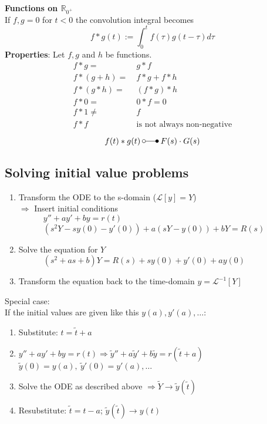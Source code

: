 \textbf{Functions on $\mathbb{R}_{0^+}$}\\
If $f,g=0$ for $t<0$ the convolution integral becomes
\begin{equation*}
    f*g(t):=\int_{0}^{t}f(\tau)g(t-\tau)d\tau
\end{equation*}
\textbf{Properties}: Let $f,g$ and $h$ be functions.
\begin{align*}
    f*g =     & \ g*f                               \\
    f*(g+h) = & \ f*g+f*h                           \\
    f*(g*h) = & \ (f*g)*h                           \\
    f*0 =     & \ 0*f=0                             \\
    f*1 \ne   & \ f                                 \\
    f*f \;    & \ \text{is not always non-negative}
\end{align*}
\begin{equation*}
    f(t)*g(t) \:\laplace\: F(s)\cdot G(s)
\end{equation*}

\subsection{Solving initial value problems}
\begin{enumerate}
    \item Transform the ODE to the s-domain ($\mathcal{L}[y]=Y$)\\
          $\Rightarrow$ Insert initial conditions\\
          $\quad\qquad y''+ay'+by=r(t)$\\
          $\quad\qquad(s^2Y-sy(0)-y'(0))+a(sY-y(0))+bY=R(s)$
    \item Solve the equation for $Y$ \\
          $\quad\qquad (s^2+as+b)Y=R(s)+sy(0)+y'(0)+ay(0)$
    \item Transform the equation back to the time-domain $y=\mathcal{L}^{-1}[Y]$
\end{enumerate}
Special case:\\
If the initial values are given like this $y(a),y'(a),\dots$:
\begin{enumerate}[label=\alph*]
    \item Substitute: $t=\tilde{t}+a$
    \item $y''+ay'+by=r(t) \Rightarrow \tilde{y}''+a\tilde{y}'+b\tilde{y}=r(\tilde{t}+a)$\\
          $\tilde{y}(0)=y(a),\:\tilde{y}'(0)=y'(a),\dots$
    \item Solve the ODE as described above $\Rightarrow \tilde{Y} \rightarrow \tilde{y}(\tilde{t})$
    \item Resubstitute: $\tilde{t}=t-a$; $\tilde{y}(\tilde{t})\rightarrow y(t)$
\end{enumerate}

